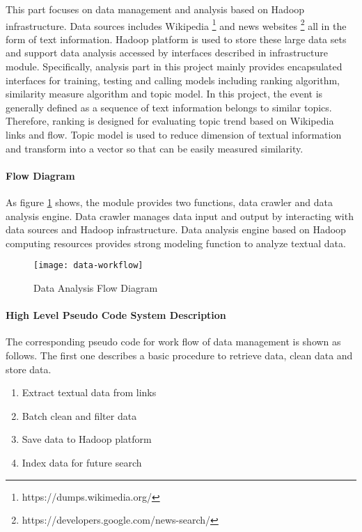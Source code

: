 This part focuses on data management and analysis based on Hadoop infrastructure. Data sources includes Wikipedia \footnote{https://dumps.wikimedia.org/} and news websites \footnote{https://developers.google.com/news-search/} all in the form of text information. Hadoop platform is used to store these large data sets and support data analysis accessed by interfaces described in infrastructure module. Specifically, analysis part in this project mainly provides encapsulated interfaces for training, testing and calling models including ranking algorithm, similarity measure algorithm and topic model. In this project, the event is generally defined as a sequence of text information belongs to similar topics. Therefore, ranking is designed for evaluating topic trend based on Wikipedia links and flow. Topic model is used to reduce dimension of textual information and transform into a vector so that can be easily measured similarity.

\paragraph{Flow Diagram}\mbox{}

As figure \ref{fig:data-workflow} shows, the module provides two functions, data crawler and data analysis engine. Data crawler manages data input and output by interacting with data sources and Hadoop infrastructure. Data analysis engine based on Hadoop computing resources provides strong modeling function to analyze textual data.

\begin{figure}[!ht]
\centering
\texttt{[image: data-workflow]}
\caption{Data Analysis Flow Diagram}
\label{fig:data-workflow}
\end{figure}

\paragraph{High Level Pseudo Code System Description}

The corresponding pseudo code for work flow of data management is shown as follows. The first one describes a basic procedure to retrieve data, clean data and store data. 

\begin{enumerate}
\item Extract textual data from links
\item Batch clean and filter data
\item Save data to Hadoop platform
\item Index data for future search
\end{enumerate}

